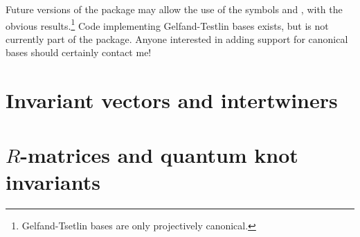 Future versions of the  package may allow the use of
the symbols  and , with
the obvious results.\footnote{Gelfand-Tsetlin bases are only projectively
canonical.} Code implementing Gelfand-Testlin bases exists, but is not
currently part of the package. Anyone interested in adding support for
canonical bases should certainly contact me!

\section{Invariant vectors and intertwiners}

\section{$R$-matrices and quantum knot invariants}
